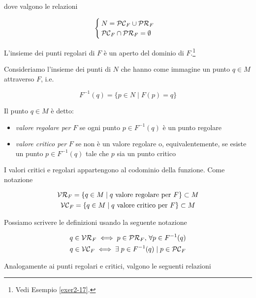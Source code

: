 dove valgono le relazioni

\begin{equation}
	\begin{cases}
		N = \mathcal{PC}_{F} \cup \mathcal{PR}_{F} \\
		\mathcal{PC}_{F} \cap \mathcal{PR}_{F} = \emptyset
	\end{cases}
\end{equation}

\begin{remark}
	L'insieme dei punti regolari di $ F $ è un aperto del dominio di $ F $.\footnote{%
		Vedi Esempio \ref{exer2-17}.%
	}
\end{remark}

Consideriamo l'insieme dei punti di $ N $ che hanno come immagine un punto $ q \in M $ attraverso $ F $, i.e.

\begin{equation}
	F^{-1}(q) = \{ p \in N \mid F(p) = q \}
\end{equation}

Il punto $ q \in M $ è detto:

\begin{itemize}
	\item \textit{valore regolare per} $ F $ se ogni punto $ p \in F^{-1}(q) $ è un punto regolare
	
	\item \textit{valore critico per} $ F $ se non è un valore regolare o, equivalentemente, se esiste un punto $ p \in F^{-1}(q) $ tale che $ p $ sia un punto critico
\end{itemize}

I valori critici e regolari appartengono al codominio della funzione. Come notazione

\begin{gather}
	\mathcal{VR}_{F} = \{ q \in M \mid q \text{ valore regolare per } F \} \subset M \\
	\mathcal{VC}_{F} = \{ q \in M \mid q \text{ valore critico per } F \} \subset M
\end{gather}

Possiamo scrivere le definizioni usando la seguente notazione

\begin{gather}
	q \in \mathcal{VR}_{F} \iff p \in \mathcal{PR}_{F}, \, \forall p \in F^{-1}(q) \\
	q \in \mathcal{VC}_{F} \iff \exists \; p \in F^{-1}(q) \mid p \in \mathcal{PC}_{F}
\end{gather}

Analogamente ai punti regolari e critici, valgono le seguenti relazioni

